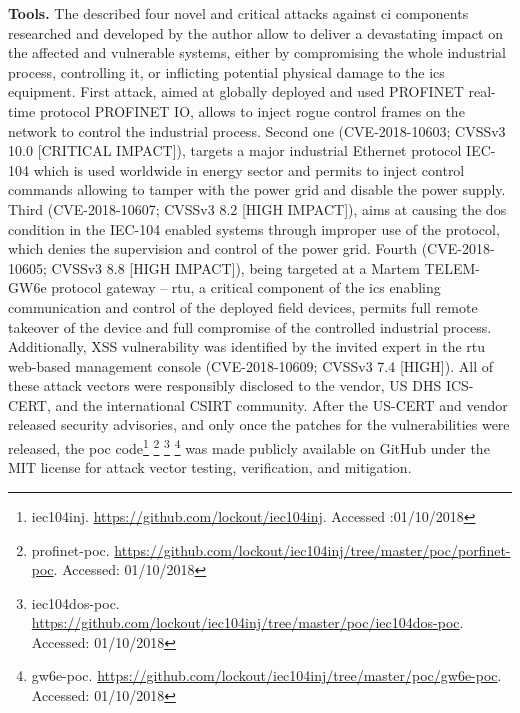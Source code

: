\textbf{Tools.}
The described four novel and critical attacks against \gls{ci} components researched and developed by the author allow to deliver a devastating impact on the affected and vulnerable systems, either by compromising the whole industrial process, controlling it, or inflicting potential physical damage to the \gls{ics} equipment. First attack, aimed at globally deployed and used PROFINET real-time protocol PROFINET IO, allows to inject rogue control frames on the network to control the industrial process.
Second one (CVE-2018-10603; CVSSv3 10.0 [CRITICAL IMPACT]), targets a major industrial Ethernet protocol IEC-104 which is used worldwide in energy sector and permits to inject control commands allowing to tamper with the power grid and disable the power supply.
Third (CVE-2018-10607; CVSSv3 8.2 [HIGH IMPACT]), aims at causing the \gls{dos} condition in the IEC-104 enabled systems through improper use of the protocol, which denies the supervision and control of the power grid.
Fourth (CVE-2018-10605; CVSSv3 8.8 [HIGH IMPACT]), being targeted at a Martem TELEM-GW6e protocol gateway -- \gls{rtu}, a critical component of the \gls{ics} enabling communication and control of the deployed field devices, permits full remote takeover of the device and full compromise of the controlled industrial process.
Additionally, XSS vulnerability was identified by the invited expert in the \gls{rtu} web-based management console (CVE-2018-10609; CVSSv3 7.4 [HIGH]).
All of these attack vectors were responsibly disclosed to the vendor, US DHS ICS-CERT, and the international CSIRT community. After the US-CERT and vendor released security advisories, and only once the patches for the vulnerabilities were released, the \gls{poc} code\footnote{iec104inj. \url{https://github.com/lockout/iec104inj}. Accessed :01/10/2018} \footnote{profinet-poc. \url{https://github.com/lockout/iec104inj/tree/master/poc/porfinet-poc}. Accessed: 01/10/2018} \footnote{iec104dos-poc. \url{https://github.com/lockout/iec104inj/tree/master/poc/iec104dos-poc}. Accessed: 01/10/2018} \footnote{gw6e-poc. \url{https://github.com/lockout/iec104inj/tree/master/poc/gw6e-poc}. Accessed: 01/10/2018} was made publicly available on GitHub under the MIT license for attack vector testing, verification, and mitigation.

